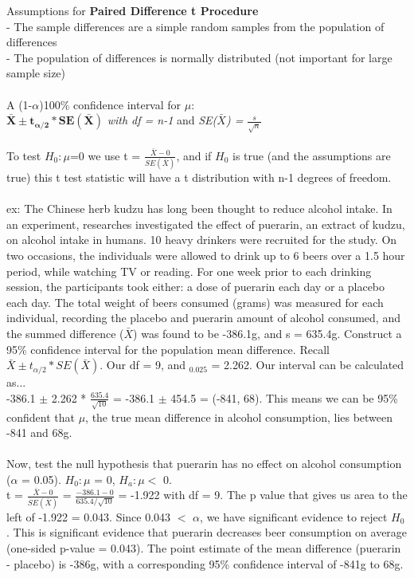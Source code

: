 \documentclass[12pt, a4paper]{article}
\begin{document}
	\noindent Assumptions for \textbf{Paired Difference t Procedure} \\
	- The sample differences are a simple random samples from the population of differences \\
	- The population of differences is normally distributed (not important for large sample size) \\~\\
	A (1-$\alpha$)100\% confidence interval for $\mu$: \\
	$\bm{\bar{X} \pm t_{\alpha/2}*SE(\bar{X})}$ \textit{with df = n-1} and \textit{SE($\bar{X}$) = $\frac{s}{\sqrt{n}}$} \\~\\
	To test $H_0: \mu$=0 we use t = $\frac{\bar{X} - 0}{SE(\bar{X})}$, and if $H_0$ is true (and the assumptions are true) this t test statistic will have a t distribution with n-1 degrees of freedom. \\~\\
	ex: The Chinese herb kudzu has long been thought to reduce alcohol intake. In an experiment, researches investigated the effect of puerarin, an extract of kudzu, on alcohol intake in humans. 10 heavy drinkers were recruited for the study. On two occasions, the individuals were allowed to drink up to 6 beers over a 1.5 hour period, while watching TV or reading. For one week prior to each drinking session, the participants took either: a dose of puerarin each day or a placebo each day. The total weight of beers consumed (grams) was measured for each individual, recording the placebo and puerarin amount of alcohol consumed, and the summed difference ($\bar{X}$) was found to be -386.1g, and s = 635.4g. Construct a 95\% confidence interval for the population mean difference. \newpage
	\noindent Recall $\bar{X} \pm t_{\alpha/2}*SE(\bar{X})$. Our df = 9, and $_{0.025}$ = 2.262. Our interval can be calculated as... \\ -386.1 $\pm$ 2.262 * $\frac{635.4}{\sqrt{10}}$ = -386.1 $\pm$ 454.5 = (-841, 68). This means we can be 95\% confident that $\mu$, the true mean difference in alcohol consumption, lies between -841 and 68g. \\~\\
	Now, test the null hypothesis that puerarin has no effect on alcohol consumption ($\alpha$ = 0.05). $H_0: \mu$ = 0, $H_a: \mu <$ 0. \\
	t = $\frac{\bar{X} - 0}{SE(\bar{X})}$ = $\frac{-386.1 - 0}{635.4/\sqrt{10}}$ = -1.922 with df = 9. The p value that gives us area to the left of -1.922 = 0.043. Since 0.043 $<$ $\alpha$, we have significant evidence to reject $H_0$. This is significant evidence that puerarin decreases beer consumption on average (one-sided p-value = 0.043). The point estimate of the mean difference (puerarin - placebo) is -386g, with a corresponding 95\% confidence interval of -841g to 68g. \newpage
	
\end{document}
